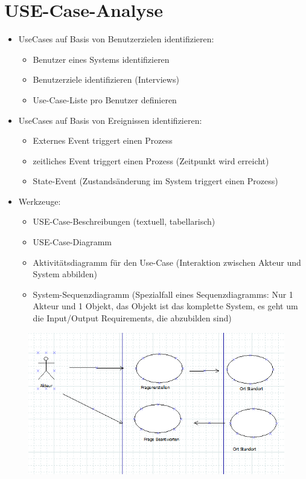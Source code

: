 \section{USE-Case-Analyse}
\begin{itemize}
	\item UseCases auf Basis von Benutzerzielen identifizieren: 
	\begin{itemize}
		\item Benutzer eines Systems identifizieren
		\item Benutzerziele identifizieren (Interviews)
		\item Use-Case-Liste pro Benutzer definieren
	
		
		
		
		
	\end{itemize}
	\item UseCases auf Basis von Ereignissen identifizieren: 
	\begin{itemize}
		\item Externes Event triggert einen Prozess
		\item zeitliches Event triggert einen Prozess (Zeitpunkt wird erreicht) 
		\item State-Event (Zustandsänderung im System triggert einen Prozess)
	\end{itemize}
	\item Werkzeuge:
	\begin{itemize}
		\item USE-Case-Beschreibungen (textuell, tabellarisch)
		\item USE-Case-Diagramm
		\item Aktivitätsdiagramm für den Use-Case (Interaktion zwischen Akteur und System abbilden)
		\item System-Sequenzdiagramm (Spezialfall eines Sequenzdiagramms: Nur 1 Akteur und 1 Objekt, das Objekt ist das komplette System, es geht um die Input/Output Requirements, die abzubilden sind)
	\end{itemize}
\end{itemize}
\begin{figure}
	\centering
	\includegraphics[width=0.7\linewidth]{usedcase}
	\caption{}
	\label{fig:usedcase}
\end{figure}
